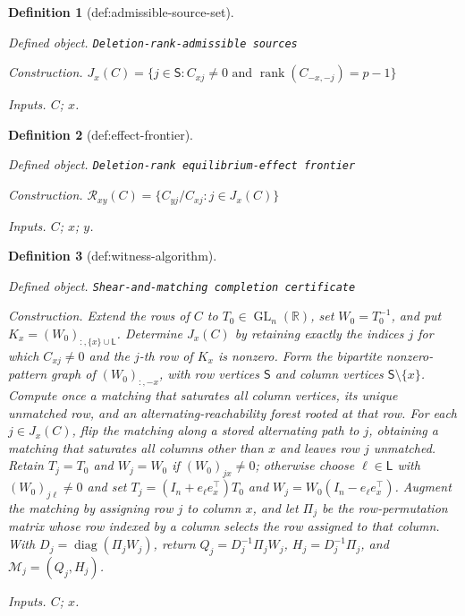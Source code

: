 \documentclass{article}
\newtheorem{definition}{Definition}
\begin{document}
\begin{definition}[def:admissible-source-set]\label{def:admissible-source-set}
\par\smallskip\noindent\emph{Defined object.} \texttt{Deletion-\allowbreak{}rank-\allowbreak{}admissible sources}
\par\smallskip\noindent\emph{Construction.} \(J_x(C)=\{j\in\mathsf S:C_{xj}\ne0\text{ and }\operatorname{rank}(C_{-x,-j})=p-1\}\)
\par\smallskip\noindent\emph{Inputs.} \(C\); \(x\).
\end{definition}

\begin{definition}[def:effect-frontier]\label{def:effect-frontier}
\par\smallskip\noindent\emph{Defined object.} \texttt{Deletion-\allowbreak{}rank equilibrium-\allowbreak{}effect frontier}
\par\smallskip\noindent\emph{Construction.} \(\mathcal R_{xy}(C)=\{C_{yj}/C_{xj}:j\in J_x(C)\}\)
\par\smallskip\noindent\emph{Inputs.} \(C\); \(x\); \(y\).
\end{definition}

\begin{definition}[def:witness-algorithm]\label{def:witness-algorithm}
\par\smallskip\noindent\emph{Defined object.} \texttt{Shear-\allowbreak{}and-\allowbreak{}matching completion certificate}
\par\smallskip\noindent\emph{Construction.} Extend the rows of \(C\) to \(T_0\in\operatorname{GL}_n(\mathbb R)\), set \(W_0=T_0^{-1}\), and put \(K_x=(W_0)_{:,\{x\}\cup\mathsf L}\). Determine \(J_x(C)\) by retaining exactly the indices \(j\) for which \(C_{xj}\ne0\) and the \(j\)-th row of \(K_x\) is nonzero. Form the bipartite nonzero-pattern graph of \((W_0)_{:, -x}\), with row vertices \(\mathsf S\) and column vertices \(\mathsf S\setminus\{x\}\). Compute once a matching that saturates all column vertices, its unique unmatched row, and an alternating-reachability forest rooted at that row. For each \(j\in J_x(C)\), flip the matching along a stored alternating path to \(j\), obtaining a matching that saturates all columns other than \(x\) and leaves row \(j\) unmatched. Retain \(T_j=T_0\) and \(W_j=W_0\) if \((W_0)_{jx}\ne0\); otherwise choose \(\ell\in\mathsf L\) with \((W_0)_{j\ell}\ne0\) and set \(T_j=(I_n+e_\ell e_x^\top)T_0\) and \(W_j=W_0(I_n-e_\ell e_x^\top)\). Augment the matching by assigning row \(j\) to column \(x\), and let \(\Pi_j\) be the row-permutation matrix whose row indexed by a column selects the row assigned to that column. With \(D_j=\operatorname{diag}(\Pi_jW_j)\), return \(Q_j=D_j^{-1}\Pi_jW_j\), \(H_j=D_j^{-1}\Pi_j\), and \(\mathcal M_j=(Q_j,H_j)\).
\par\smallskip\noindent\emph{Inputs.} \(C\); \(x\).
\end{definition}
\end{document}
